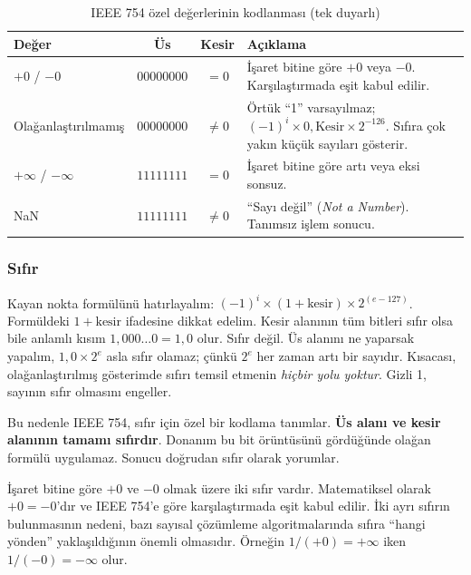 \begin{table}[htbp]
\centering
\caption{IEEE 754 özel değerlerinin kodlanması (tek duyarlı)}
\label{tab:ozel-degerler-kodlama}
\small
\begin{tabularx}{\textwidth}{l c c X}
\toprule
\textbf{Değer} & \textbf{Üs} & \textbf{Kesir} & \textbf{Açıklama} \\
\midrule
$+0$ / $-0$ & $00000000$ & $= 0$ & İşaret bitine göre $+0$ veya $-0$. Karşılaştırmada eşit kabul edilir. \\[3pt]
Olağanlaştırılmamış\index{olağanlaştırılmamış sayı}\index{denormalized number|see{olağanlaştırılmamış sayı}} & $00000000$ & $\neq 0$ & Örtük ``1'' varsayılmaz; $(-1)^i \times 0{,}\text{Kesir} \times 2^{-126}$. Sıfıra çok yakın küçük sayıları gösterir. \\[3pt]
$+\infty$ / $-\infty$\index{sonsuz}\index{infinity|see{sonsuz}} & $11111111$ & $= 0$ & İşaret bitine göre artı veya eksi sonsuz. \\[3pt]
NaN\index{NaN} & $11111111$ & $\neq 0$ & ``Sayı değil'' (\emph{Not a Number}). Tanımsız işlem sonucu. \\
\bottomrule
\end{tabularx}
\end{table}

\subsubsection{Sıfır}

Kayan nokta formülünü hatırlayalım: $(-1)^i \times (1 + \text{kesir}) \times 2^{(e - 127)}$. Formüldeki $1 + \text{kesir}$ ifadesine dikkat edelim. Kesir alanının tüm bitleri sıfır olsa bile anlamlı kısım $1{,}000\ldots0 = 1{,}0$ olur. Sıfır değil. Üs alanını ne yaparsak yapalım, $1{,}0 \times 2^e$ asla sıfır olamaz; çünkü $2^e$ her zaman artı bir sayıdır. Kısacası, olağanlaştırılmış gösterimde sıfırı temsil etmenin \emph{hiçbir yolu yoktur}. Gizli 1, sayının sıfır olmasını engeller.

Bu nedenle IEEE 754, sıfır için özel bir kodlama tanımlar. \textbf{Üs alanı ve kesir alanının tamamı sıfırdır}. Donanım bu bit örüntüsünü gördüğünde olağan formülü uygulamaz. Sonucu doğrudan sıfır olarak yorumlar.

İşaret bitine göre $+0$ ve $-0$ olmak üzere iki sıfır vardır. Matematiksel olarak $+0 = -0$'dır ve IEEE 754'e göre karşılaştırmada eşit kabul edilir. İki ayrı sıfırın bulunmasının nedeni, bazı sayısal çözümleme algoritmalarında sıfıra ``hangi yönden'' yaklaşıldığının önemli olmasıdır. Örneğin $1 / (+0) = +\infty$ iken $1 / (-0) = -\infty$ olur.

